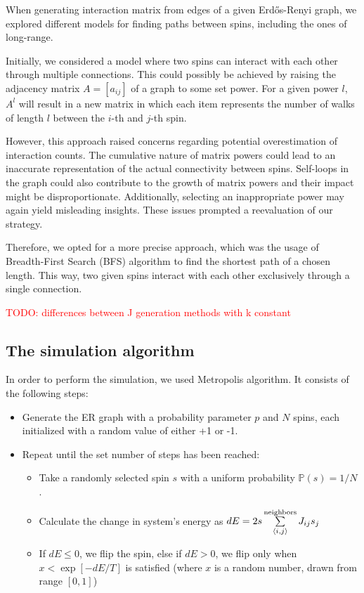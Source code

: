 \documentclass[11pt,a4paper]{article}
\newcommand{\todo}[1]{\textcolor{red}{TODO: #1}}
\begin{document}
When generating interaction matrix from edges of a given Erdős-Renyi graph, we explored different models for finding paths between spins, including the ones of long-range.

Initially, we considered a model where two spins can interact with each other through multiple connections. This could possibly be achieved by raising the adjacency matrix $A=[a_{ij}]$ of a graph to some set power. For a given power $l$, $A^l$ will result in a new matrix in which each item represents the number of walks of length $l$ between the $i$-th and $j$-th spin.

However, this approach raised concerns regarding potential overestimation of interaction counts. The cumulative nature of matrix powers could lead to an inaccurate representation of the actual connectivity between spins. Self-loops in the graph could also contribute to the growth of matrix powers and their impact might be disproportionate. Additionally, selecting an inappropriate power may again yield misleading insights. These issues prompted a reevaluation of our strategy.

Therefore, we opted for a more precise approach, which was the usage of Breadth-First Search (BFS) algorithm to find the shortest path of a chosen length. This way, two given spins interact with each other exclusively through a single connection.

\todo{differences between J generation methods with k constant}

\subsection{The simulation algorithm}

In order to perform the simulation, we used Metropolis algorithm. It consists of the following steps:
\begin{itemize}
\item Generate the ER graph with a probability parameter $p$ and $N$ spins, each initialized with a random value of either +1 or -1.
\item Repeat until the set number of steps has been reached:
    \begin{itemize}
    \item Take a randomly selected spin $s$ with a uniform probability $\mathbb{P}(s)=1/N$.
    \item Calculate the change in system's energy as $dE = 2 s \sum\limits_{\braket{i,j}}^\text{neighbors} J_{ij} s_j$
    \item If $dE\leq0$, we flip the spin, else if $dE>0$, we flip only when $x < \exp[-dE/T]$ is satisfied (where $x$ is a random number, drawn from range $[0,1]$)
    \end{itemize}
\end{itemize}
\end{document}

